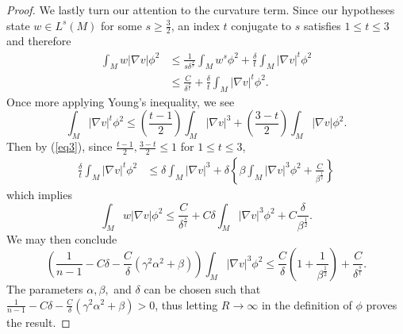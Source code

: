 \documentclass[10pt,a4paper]{amsart}
\begin{document}
\begin{proof}
We lastly turn our attention to the curvature term. Since our hypotheses state $w\in L^s(M)$ for some $s\geq\frac{3}{2}$, an index $t$ conjugate to $s$ satisfies $1\leq t\leq 3$ and therefore
\begin{align*}
\int_M w|\nabla v|\phi^2 &\leq \frac{1}{s\delta^\frac{s}{t}}\int_M w^s\phi^2+\frac{\delta}{t}\int_M |\nabla v|^t\phi^2\\
&\leq \frac{C}{\delta^\frac{s}{t}}+\frac{\delta}{t}\int_M|\nabla v|^t\phi^2.
\end{align*}
Once more applying Young's inequality, we see
\begin{equation*}
\int_M |\nabla v|^t\phi^2\leq \left(\frac{t-1}{2}\right)\int_M |\nabla v|^3+\left(\frac{3-t}{2}\right)\int_M|\nabla v|\phi^2.
\end{equation*}
Then by (\ref{eq3}), since $\frac{t-1}{2}, \frac{3-t}{2}\leq 1$ for $1\leq t\leq 3$,
\begin{align*}
\frac{\delta}{t}\int_M |\nabla v|^t\phi^2 &\leq \delta\int_M |\nabla v|^3+\delta\left\{\beta\int_M |\nabla v|^3\phi^2+\frac{C}{\beta^\frac{1}{2}}\right\}
\end{align*}
which implies
\begin{equation*}
\int_M w|\nabla v|\phi^2\leq \frac{C}{\delta^\frac{s}{t}} + C\delta \int_M|\nabla v|^3\phi^2 + C\frac{\delta}{\beta^\frac{1}{2}}.
\end{equation*}
We may then conclude
\begin{equation*}
\left(\frac{1}{n-1}-C\delta -\frac{C}{\delta}(\gamma^2\alpha^2+\beta)\right)\int_M|\nabla v|^3\phi^2\leq \frac{C}{\delta}\left(1+\frac{1}{\beta^\frac{1}{2}}\right)+\frac{C}{\delta^\frac{s}{t}}.
\end{equation*}
The parameters $\alpha,\beta,$ and $\delta$ can be chosen such that $\frac{1}{n-1}-C\delta -\frac{C}{\delta}(\gamma^2\alpha^2+\beta)>0$, thus letting $R\to\infty$ in the definition of $\phi$ proves the result.
\end{proof}
\end{document}
